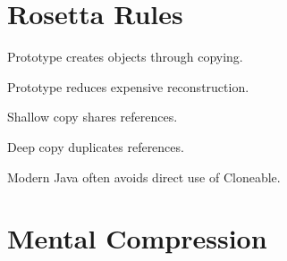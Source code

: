\documentclass[11pt,a4paper]{book}
\begin{document}

\section{Rosetta Rules}

\begin{rosettarule}

Prototype creates objects
through copying.

\end{rosettarule}


\begin{rosettarule}

Prototype reduces expensive
reconstruction.

\end{rosettarule}


\begin{rosettarule}

Shallow copy shares references.

\end{rosettarule}


\begin{rosettarule}

Deep copy duplicates references.

\end{rosettarule}


\begin{rosettarule}

Modern Java often avoids direct
use of Cloneable.

\end{rosettarule}


\section{Mental Compression}
\end{document}
